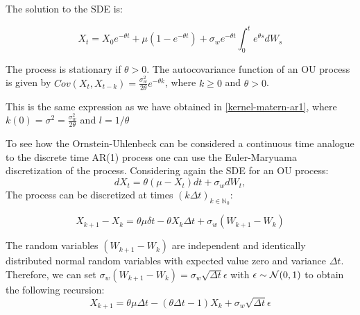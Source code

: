 The solution to the SDE is:

$$ X_t = X_0 e^{-\theta t} + \mu (1-e^{-\theta t}) +
\sigma_w e^{-\theta t} \int_{0}^{t} e^{\theta s} dW_s$$

%
%
%
%
%
%
%
%
%
%
%
%
%
%
The process is stationary if $\theta > 0$.
The autocovariance function of an OU process is given by
$Cov(X_t, X_{t-k}) = \frac{\sigma_w^2}{2\theta} e^{-\theta k}$,
where $k\geq 0$ and $\theta > 0$.

This is the same expression as we have obtained in \ref{kernel-matern-ar1}, where
$k(0) = \sigma^2 = \frac{\sigma_w^2}{2\theta}$ and $l=1/\theta$

To see how the Ornstein-Uhlenbeck can be considered a continuous time analogue to the discrete time
AR(1) process one can use the Euler-Maryuama discretization of the process.
Considering again the SDE for an OU process:
$$dX_t = \theta (\mu - X_t)dt + \sigma_w dW_t,$$
The process can be discretized at times $(k \Delta t)_{k \in \mathbb{N}_0}$:

$$ X_{k+1} - X_k = \theta \mu \delta t - \theta X_k \Delta t + \sigma_w (W_{k+1} - W_k)$$

The random variables $(W_{k+1} - W_k)$ are independent and identically distributed normal random variables
with expected value zero and variance $\Delta t$.
Therefore, we can set $\sigma_w (W_{k+1} - W_k) = \sigma_w \sqrt{\Delta t} \epsilon$ with $\epsilon \sim \operatorname{\mathcal{N}}(0,1)$
to obtain the following recursion:
$$ X_{k+1} = \theta \mu \Delta t - (\theta \Delta t - 1) X_k + \sigma_w \sqrt{\Delta t} \epsilon$$

